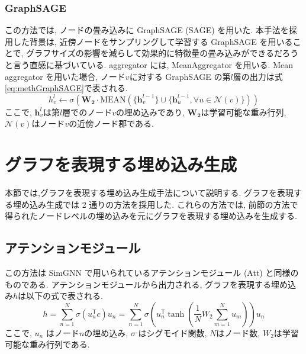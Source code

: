 \documentclass[a4j,twoside,12pt, dvipdfmx]{thesis} %
\begin{document}
\subsubsection{GraphSAGE}
この方法では, ノードの畳み込みに GraphSAGE\cite{hamilton2017inductive} (SAGE) を用いた.
本手法を採用した背景は, 近傍ノードをサンプリングして学習する GraphSAGE を用いることで, グラフサイズの影響を減らして効果的に特徴量の畳み込みができるだろうと言う直感に基づいている.
aggregator には, MeanAggregator を用いる.
Mean aggregator を用いた場合, ノード$v$に対する GraphSAGE の第$l$層の出力は式\ref{eq:methGraphSAGE}で表される.
\begin{equation}
  \label{eq:methGraphSAGE}
  h_{v}^{l} \leftarrow \sigma(\mathbf{W_{2}} \cdot \mathrm{MEAN} (\{ \mathbf{h}_{v}^{l-1}\} \cup \{ \mathbf{h}_{u}^{l-1} , \forall u \in \mathcal{N}(v) \}))
\end{equation}
ここで, $\mathbf{h}_{v}^{l}$は第$l$層でのノード$v$の埋め込みであり, $\mathbf{W_{2}}$は学習可能な重み行列, $\mathcal{N}(v)$はノード$v$の近傍ノード郡である.

\section{グラフを表現する埋め込み生成}\label{meth:createEmbedding}
本節では,グラフを表現する埋め込み生成手法について説明する.
グラフを表現する埋め込み生成では 2 通りの方法を採用した.
これらの方法では, 前節の方法で得られたノードレベルの埋め込みを元にグラフを表現する埋め込みを生成する.

\subsection{アテンションモジュール}
この方法は SimGNN で用いられているアテンションモジュール (Att) と同様のものである.
アテンションモジュールから出力される, グラフを表現する埋め込み$h$は以下の式で表される.
\begin{equation}
  h = \sum_{n=1}^{N}\sigma(u_{n}^\mathsf{T}c)u_{n}= \sum_{n=1}^{N}\sigma(u_{n}^\mathsf{T} \tanh (\frac{1}{N}W_{2}\sum_{m=1}^{N}u_{m}))u_{n}
\end{equation}
ここで, $u_{n}$ はノード$n$の埋め込み, $\sigma$ はシグモイド関数, $N$はノード数, $W_{2}$は学習可能な重み行列である.
\end{document}
